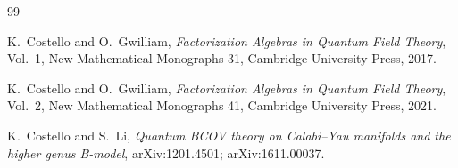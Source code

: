 \documentclass[11pt]{article}
\theoremstyle{definition}
\begin{document}
\begin{thebibliography}{99}

K.~Costello and O.~Gwilliam,
\emph{Factorization Algebras in Quantum Field Theory},
Vol.~1, New Mathematical Monographs 31, Cambridge University Press,
2017.

K.~Costello and O.~Gwilliam,
\emph{Factorization Algebras in Quantum Field Theory},
Vol.~2, New Mathematical Monographs 41, Cambridge University Press,
2021.

K.~Costello and S.~Li,
\emph{Quantum BCOV theory on Calabi--Yau manifolds and the higher genus
B-model}, arXiv:1201.4501; arXiv:1611.00037.

\end{thebibliography}
\end{document}

